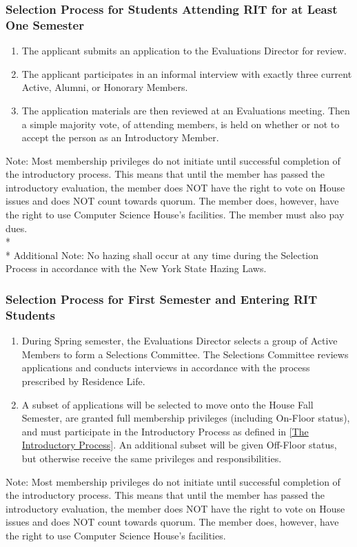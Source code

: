 \documentclass{article}
\newcommand{\bsubsection}[1]{\subsubsection{#1} \label{#1}}
\begin{document}
\renewcommand{\theenumi}{\alph{enumi}} %
\bsubsection{Selection Process for Students Attending RIT for at Least One Semester}
\begin{enumerate}
	\item The applicant submits an application to the Evaluations Director for review.
	\item The applicant participates in an informal interview with exactly three current Active, Alumni, or Honorary Members.
	\item The application materials are then reviewed at an Evaluations meeting.
	Then a simple majority vote, of attending members, is held on whether or not to accept the person as an Introductory Member.
\end{enumerate}
Note: Most membership privileges do not initiate until successful completion of the introductory process.
This means that until the member has passed the introductory evaluation, the member does NOT have the right to vote on House issues and does NOT count towards quorum.
The member does, however, have the right to use Computer Science House's facilities.
The member must also pay dues.
\\* \\*
Additional Note: No hazing shall occur at any time during the Selection Process in accordance with the New York State Hazing Laws.
\bsubsection{Selection Process for First Semester and Entering RIT Students}
\begin{enumerate}
	\item During Spring semester, the Evaluations Director selects a group of Active Members to form a Selections Committee.
		The Selections Committee reviews applications and conducts interviews in accordance with the process prescribed by Residence Life.
	\item A subset of applications will be selected to move onto the House Fall Semester, are granted full membership privileges (including On-Floor status), and must participate in the Introductory Process as defined in \ref{The Introductory Process}.
		An additional subset will be given Off-Floor status, but otherwise receive the same privileges and responsibilities.
\end{enumerate}
Note: Most membership privileges do not initiate until successful completion of the introductory process.
This means that until the member has passed the introductory evaluation, the member does NOT have the right to vote on House issues and does NOT count towards quorum.
The member does, however, have the right to use Computer Science House's facilities.
\end{document}

